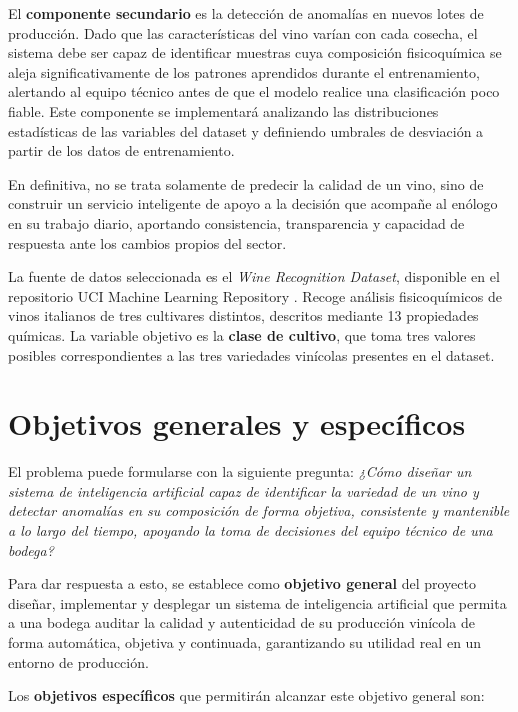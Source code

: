 El \textbf{componente secundario} es la detección de anomalías en nuevos 
lotes de producción. Dado que las características del vino varían con cada 
cosecha, el sistema debe ser capaz de identificar muestras cuya composición 
fisicoquímica se aleja significativamente de los patrones aprendidos durante 
el entrenamiento, alertando al equipo técnico antes de que el modelo realice 
una clasificación poco fiable. Este componente se implementará analizando 
las distribuciones estadísticas de las variables del dataset y definiendo 
umbrales de desviación a partir de los datos de entrenamiento.

En definitiva, no se trata solamente de predecir la calidad de un vino, sino de construir 
un servicio inteligente de apoyo a la decisión que acompañe al enólogo en su 
trabajo diario, aportando consistencia, transparencia y capacidad de respuesta ante los 
cambios propios del sector.

La fuente de datos seleccionada es el \textit{Wine Recognition Dataset}, 
disponible en el repositorio UCI Machine Learning Repository \cite{UCIWine}. 
Recoge análisis fisicoquímicos de vinos italianos de tres cultivares distintos, 
descritos mediante 13 propiedades químicas. La variable objetivo es la \textbf{clase de cultivo}, que toma tres valores posibles correspondientes a las tres variedades vinícolas presentes en el dataset.


\section{Objetivos generales y específicos}

El problema puede formularse con la siguiente pregunta: \textit{¿Cómo diseñar un 
sistema de inteligencia artificial capaz de identificar la variedad de un vino y 
detectar anomalías en su composición de forma objetiva, consistente y mantenible 
a lo largo del tiempo, apoyando la toma de decisiones del equipo técnico de una bodega?}

Para dar respuesta a esto, se establece como \textbf{objetivo general} del 
proyecto diseñar, implementar y desplegar un sistema de inteligencia artificial que 
permita a una bodega auditar la calidad y autenticidad de su producción vinícola de 
forma automática, objetiva y continuada, garantizando su utilidad real en un entorno 
de producción.

Los \textbf{objetivos específicos} que permitirán alcanzar este objetivo general son:

